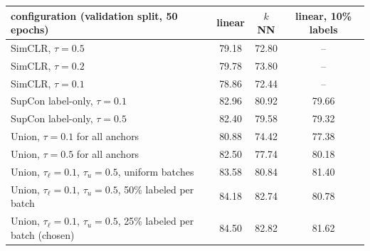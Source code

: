 \begin{tabular}{l ccc}
\toprule
configuration (validation split, 50 epochs) & linear & $k$NN & linear, 10\% labels \\
\midrule
SimCLR, $\tau{=}0.5$ & 79.18 & 72.80 & -- \\
SimCLR, $\tau{=}0.2$ & 79.78 & 73.80 & -- \\
SimCLR, $\tau{=}0.1$ & 78.86 & 72.44 & -- \\
SupCon label-only, $\tau{=}0.1$ & 82.96 & 80.92 & 79.66 \\
SupCon label-only, $\tau{=}0.5$ & 82.40 & 79.58 & 79.32 \\
Union, $\tau{=}0.1$ for all anchors & 80.88 & 74.42 & 77.38 \\
Union, $\tau{=}0.5$ for all anchors & 82.50 & 77.74 & 80.18 \\
Union, $\tau_\ell{=}0.1$, $\tau_u{=}0.5$, uniform batches & 83.58 & 80.84 & 81.40 \\
Union, $\tau_\ell{=}0.1$, $\tau_u{=}0.5$, 50\% labeled per batch & 84.18 & 82.74 & 80.78 \\
Union, $\tau_\ell{=}0.1$, $\tau_u{=}0.5$, 25\% labeled per batch (chosen) & 84.50 & 82.82 & 81.62 \\
\bottomrule
\end{tabular}
